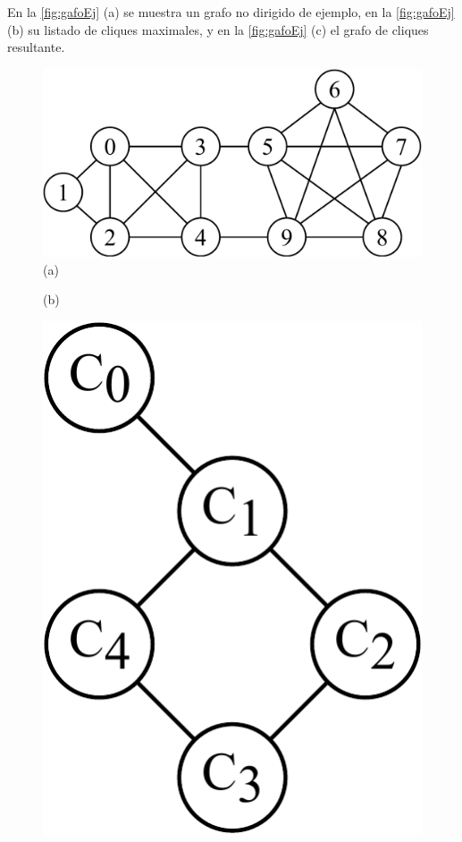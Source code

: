 En la \autoref{fig:gafoEj} (a) se muestra un grafo no dirigido de ejemplo, en la \autoref{fig:gafoEj} (b) su listado de cliques maximales, y en la \autoref{fig:gafoEj} (c) el grafo de cliques resultante.


\begin{figure}
    	\centering
    	\begin{minipage}{0.4\textwidth}
    		\centering
    		\includegraphics[width=1\linewidth,clip=true]{img/graphs-Graph2.pdf}
    		(a)
    	\end{minipage}
    	\begin{minipage}{0.4\textwidth}
    		\centering
    		
    		(b)
    	\end{minipage}
    	\begin{minipage}{0.15\textwidth}
    		\centering
    		\includegraphics[width=1\linewidth,clip=true]{img/graphs-Cliques2.pdf}

\end{minipage}
\end{figure}
